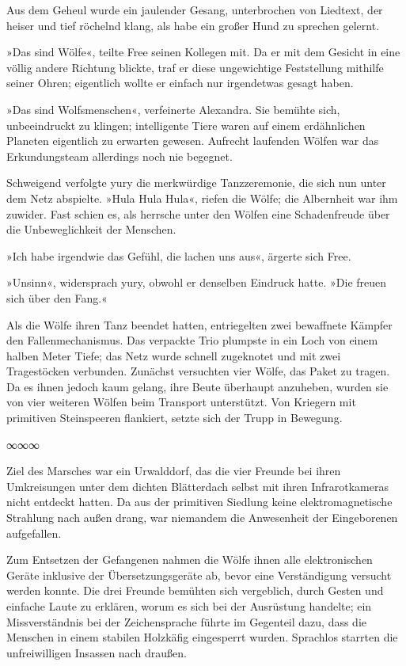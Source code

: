 Aus dem Geheul wurde ein jaulender Gesang, unterbrochen von Liedtext, der heiser und tief röchelnd klang, als habe ein großer Hund zu sprechen gelernt.

»Das sind Wölfe«, teilte Free seinen Kollegen mit. Da er mit dem Gesicht in eine völlig andere Richtung blickte, traf er diese ungewichtige Feststellung mithilfe seiner Ohren; eigentlich wollte er einfach nur irgendetwas gesagt haben.

»Das sind Wolfsmenschen«, verfeinerte Alexandra. Sie bemühte sich, unbeeindruckt zu klingen; intelligente Tiere waren auf einem erdähnlichen Planeten eigentlich zu erwarten gewesen. Aufrecht laufenden Wölfen war das Erkundungsteam allerdings noch nie begegnet.

Schweigend verfolgte yury die merkwürdige Tanzzeremonie, die sich nun unter dem Netz abspielte. »Hula Hula Hula«, riefen die Wölfe; die Albernheit war ihm zuwider. Fast schien es, als herrsche unter den Wölfen eine Schadenfreude über die Unbeweglichkeit der Menschen.

»Ich habe irgendwie das Gefühl, die lachen uns aus«, ärgerte sich Free.

»Unsinn«, widersprach yury, obwohl er denselben Eindruck hatte. »Die freuen sich über den Fang.«

Als die Wölfe ihren Tanz beendet hatten, entriegelten zwei bewaffnete Kämpfer den Fallenmechanismus. Das verpackte Trio plumpste in ein Loch von einem halben Meter Tiefe; das Netz wurde schnell zugeknotet und mit zwei Tragestöcken verbunden. Zunächst versuchten vier Wölfe, das Paket zu tragen. Da es ihnen jedoch kaum gelang, ihre Beute überhaupt anzuheben, wurden sie von vier weiteren Wölfen beim Transport unterstützt. Von Kriegern mit primitiven Steinspeeren flankiert, setzte sich der Trupp in Bewegung.

\begin{center}
∞∞∞
\end{center}

Ziel des Marsches war ein Urwalddorf, das die vier Freunde bei ihren Umkreisungen unter dem dichten Blätterdach selbst mit ihren Infrarotkameras nicht entdeckt hatten. Da aus der primitiven Siedlung keine elektromagnetische Strahlung nach außen drang, war niemandem die Anwesenheit der Eingeborenen aufgefallen.

Zum Entsetzen der Gefangenen nahmen die Wölfe ihnen alle elektronischen Geräte inklusive der Übersetzungsgeräte ab, bevor eine Verständigung versucht werden konnte. Die drei Freunde bemühten sich vergeblich, durch Gesten und einfache Laute zu erklären, worum es sich bei der Ausrüstung handelte; ein Missverständnis bei der Zeichensprache führte im Gegenteil dazu, dass die Menschen in einem stabilen Holzkäfig eingesperrt wurden. Sprachlos starrten die unfreiwilligen Insassen nach draußen.


